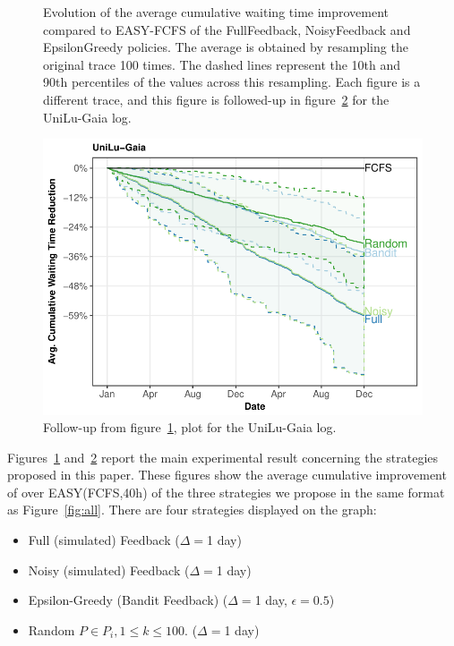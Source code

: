 \documentclass[sigconf,review,anonymous]{acmart}
\begin{document}
\begin{figure}[]
  \caption{Evolution of the average cumulative waiting time improvement
    compared to EASY-FCFS of the FullFeedback, NoisyFeedback and EpsilonGreedy
    policies. The average is obtained by resampling the original trace 100
    times. The dashed lines represent the 10th and 90th percentiles of the
  values across this resampling. Each figure is a different trace, and this
figure is followed-up in figure~\ref{fig:follow} for the UniLu-Gaia log.}

  \label{fig:small}
\end{figure}

\begin{figure}[]
  \centering
  \includegraphics[scale=0.6]{figures/UniLu-Ga.pdf}

  \caption{Follow-up from figure~\ref{fig:small}, plot for the UniLu-Gaia log.}

  \label{fig:follow}
\end{figure}

Figures~\ref{fig:small} and~\ref{fig:follow} report the main experimental
result concerning the strategies proposed in this paper. These figures show the
average cumulative improvement of over EASY(FCFS,40h) of the three strategies
we propose in the same format as Figure~\ref{fig:all}.  There are four
strategies displayed on the graph:

\begin{itemize}
  \item Full (simulated) Feedback ($\Delta=$1 day)
  \item Noisy (simulated) Feedback ($\Delta=$1 day)
  \item Epsilon-Greedy (Bandit Feedback) ($\Delta=$1 day, $\epsilon=0.5$)
  \item Random $P \in P_i, 1 \le k \le 100$. ($\Delta=$1 day)
\end{itemize}
\end{document}
